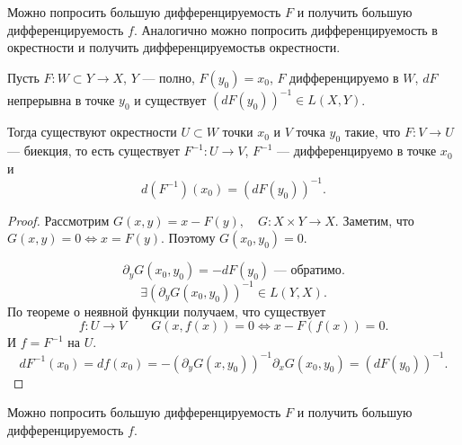 \begin{note}
    Можно попросить большую дифференцируемость $ F$ и получить большую дифференцируемость  $ f$.  Аналогично можно попросить дифференцируемость в окрестности и получить дифференцируемостьв окрестности.
\end{note}
\begin{thm}
    Пусть  $ F\colon W \subset Y \to  X$, $ Y$ --- полно, 
	$ F(y_0) = x_0$,
	$ F$ дифференцируемо в  $ W$,
	$ dF$ непрерывна в точке   $ y_0$ 
	и существует  $ \left( dF(y_0) \right)^{-1} \in L(X, Y) $.

	Тогда существуют окрестности $ U \subset W$ точки $ x_0 $ и $ V$ точка  $ y_0$ такие,
	что $ F \colon V \to  U$ --- биекция,
	то есть существует $ F^{-1} \colon U \to  V$,
	$ F ^{-1}$ --- дифференцируемо  в точке $ x_0$ и 
    \[
		d(F^{-1})(x_0) = \left( dF(y_0) \right)^{-1}
    .\] 
\end{thm}
\begin{proof}
    Рассмотрим $ G(x, y) = x - F(y), \quad G\colon X \times Y \to  X$.
    Заметим, что $ G(x, y) = 0 \Longleftrightarrow x = F(y)$. Поэтому  
    $ G(x_0, y_0) = 0$.

    \[
	\partial _yG(x_0, y_0) = -dF(y_0) \text{ --- обратимо}
    .\] 
    \[
	\exists (\partial _yG(x_0, y_0))^{-1} \in L(Y, X)
    .\] 
    По теореме о неявной функции получаем, что существует 
    \[
	f\colon U \to  V \qquad G(x, f(x) ) = 0 \Longleftrightarrow x - F(f(x))= 0
    .\] 
    И  $ f = F^{-1}$ на  $ U$.
    \[
		dF^{-1}(x_0) = df(x_0) = -\left( \partial _y G(x, y_0) \right)^{-1}\partial _x G(x_0, y_0)  = (dF(y_0))^{-1}
    .\] 
\end{proof}
\begin{note}
    Можно попросить большую дифференцируемость $ F$ и получить большую дифференцируемость  $ f$.
\end{note}
% 
